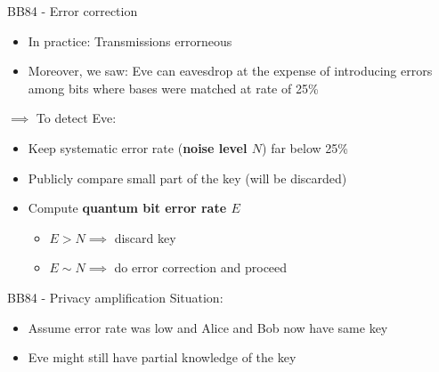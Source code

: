 \documentclass{beamer}
\begin{document}
	\begin{frame}{BB84 - Error correction}
		\begin{itemize}
			\item In practice: Transmissions errorneous
			\item Moreover, we saw: Eve can eavesdrop at the expense of
			introducing errors among bits where bases were matched at
			rate of 25\%
		\end{itemize}
		$\implies$ To detect Eve:
		\begin{itemize}
			\item Keep systematic error rate (\textbf{noise level $N$})
			far below 25\%
			\item Publicly compare small part of the key (will be discarded)
			\item Compute \textbf{quantum bit error rate $E$}
			\begin{itemize}
				\item $E > N \implies$ discard key
				\item $E \sim N \implies$ do error correction and proceed
			\end{itemize}
		\end{itemize}
	\end{frame}

	\begin{frame}{BB84 - Privacy amplification}
		Situation:
		\begin{itemize}
			\item Assume error rate was low and Alice and Bob now have
			same key
			\item Eve might still have partial knowledge of the key
		\end{itemize}

	\end{frame}
\end{document}
